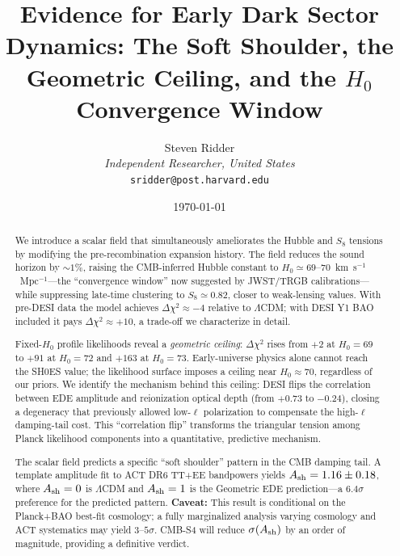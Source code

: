 \documentclass[a4paper,11pt]{article}
\title{Evidence for Early Dark Sector Dynamics: The Soft Shoulder, the Geometric Ceiling, and the $H_0$ Convergence Window}
\author{Steven Ridder\\
\textit{Independent Researcher, United States}\\
\texttt{sridder@post.harvard.edu}}
\date{\today}
\begin{document}
\maketitle

\begin{abstract}
We introduce a scalar field that simultaneously ameliorates the Hubble and $S_8$ tensions by modifying the pre-recombination expansion history. The field reduces the sound horizon by $\sim 1\%$, raising the CMB-inferred Hubble constant to $H_0 \simeq 69$--$70$~km~s$^{-1}$~Mpc$^{-1}$---the ``convergence window'' now suggested by JWST/TRGB calibrations---while suppressing late-time clustering to $S_8 \simeq 0.82$, closer to weak-lensing values. With pre-DESI data the model achieves $\Delta\chi^2 \approx -4$ relative to $\Lambda$CDM; with DESI Y1 BAO included it pays $\Delta\chi^2 \approx +10$, a trade-off we characterize in detail.

Fixed-$H_0$ profile likelihoods reveal a \emph{geometric ceiling}: $\Delta\chi^2$ rises from $+2$ at $H_0 = 69$ to $+91$ at $H_0 = 72$ and $+163$ at $H_0 = 73$. Early-universe physics alone cannot reach the SH0ES value; the likelihood surface imposes a ceiling near $H_0 \approx 70$, regardless of our priors. We identify the mechanism behind this ceiling: DESI flips the correlation between EDE amplitude and reionization optical depth (from $+0.73$ to $-0.24$), closing a degeneracy that previously allowed low-$\ell$ polarization to compensate the high-$\ell$ damping-tail cost. This ``correlation flip'' transforms the triangular tension among Planck likelihood components into a quantitative, predictive mechanism.

The scalar field predicts a specific ``soft shoulder'' pattern in the CMB damping tail. A template amplitude fit to ACT DR6 TT+EE bandpowers yields $A_{\rm sh} = 1.16 \pm 0.18$, where $A_{\rm sh} = 0$ is $\Lambda$CDM and $A_{\rm sh} = 1$ is the Geometric EDE prediction---a $6.4\sigma$ preference for the predicted pattern. \textbf{Caveat:} This result is conditional on the Planck+BAO best-fit cosmology; a fully marginalized analysis varying cosmology and ACT systematics may yield $3$--$5\sigma$. CMB-S4 will reduce $\sigma(A_{\rm sh})$ by an order of magnitude, providing a definitive verdict.
\end{abstract}

\end{document}
